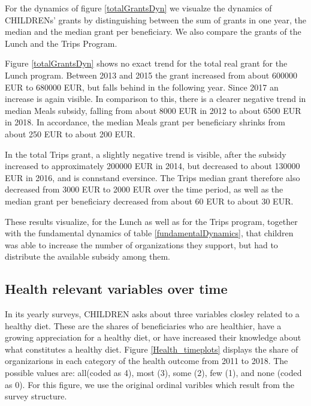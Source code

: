 \documentclass[12pt, a4paper, titlepage]{article}\usepackage[]{graphicx}\usepackage[]{color}
\begin{document}
For the dynamics of figure \ref{totalGrantsDyn} we visualze the dynamics of CHILDRENs' grants by distinguishing between the sum of grants in one year, the median and the median grant per beneficiary. We also compare the grants of the Lunch and the Trips Program.

Figure \ref{totalGrantsDyn} shows no exact trend for the total real grant for the Lunch program. Between 2013 and 2015 the grant increased from about 600000 EUR to 680000 EUR, but falls behind in the following year. Since 2017 an increase is again visible. In comparison to this, there is a clearer negative trend in median Meals subsidy, falling from about 8000 EUR in 2012 to about 6500 EUR in 2018. In accordance, the median Meals grant per beneficiary shrinks from about 250 EUR to about 200 EUR. 

In the total Trips grant, a slightly negative trend is visible, after the subsidy increased to approximately 200000 EUR in 2014, but decreased to about 130000 EUR in 2016, and is connstand eversince. The Trips median grant therefore also decreased from 3000 EUR to 2000 EUR over the time period, as well as the median grant per beneficiary decreased from about 60 EUR to about 30 EUR.

These results visualize, for the Lunch as well as for the Trips program, together with the fundamental dynamics of table \ref{fundamentalDynamics}, that children was able to increase the number of organizations they support, but had to distribute the available subsidy among them. 

\subsection{Health relevant variables over time} 

In its yearly surveys, CHILDREN asks about three variables closley related to a healthy diet. These are the shares of beneficiaries who are healthier, have a growing appreciation for a healthy diet, or have increased their knowledge about what constitutes a healthy diet. Figure \ref{Health_timeplots} displays the share of organizarions in each category of the health outcome from 2011 to 2018. The possible values are: all(coded as 4), most (3), some (2), few (1), and none (coded as 0). For this figure, we use the original ordinal varibles which result from the survey structure.  
\end{document}
